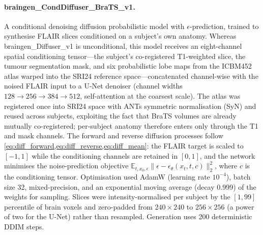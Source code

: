 \paragraph{braingen\_CondDiffuser\_BraTS\_v1.} A conditional denoising diffusion probabilistic
model\cite{ho2020denoising} with $\epsilon$-prediction, trained to synthesise FLAIR slices
conditioned on a subject's own anatomy. Whereas braingen\_Diffuser\_v1 is unconditional, this
model receives an eight-channel spatial conditioning tensor---the subject's co-registered
T1-weighted slice, the tumour segmentation mask, and six probabilistic lobe maps from the
ICBM452 atlas\cite{mazziotta2001probabilistic} warped into the SRI24\cite{rohlfing2010sri24}
reference space---concatenated channel-wise with the noised FLAIR input to a U-Net denoiser
(channel widths $128\!\to\!256\!\to\!384\!\to\!512$, self-attention at the coarsest scale). The
atlas was registered once into SRI24 space with ANTs symmetric normalisation
(SyN)\cite{avants2008syn} and reused across subjects, exploiting the fact that BraTS volumes
are already mutually co-registered; per-subject anatomy therefore enters only through the T1
and mask channels. The forward and reverse diffusion processes follow
\cref{eq:diff_forward,eq:diff_reverse,eq:diff_mean}: the FLAIR target is scaled to $[-1,1]$
while the conditioning channels are retained in $[0,1]$, and the network minimises the
noise-prediction objective
$\mathbb{E}_{t,x_{0},\epsilon}\lVert \epsilon - \epsilon_{\theta}(x_{t},t,c)\rVert_{2}^{2}$,
where $c$ is the conditioning tensor. Optimisation used AdamW (learning rate $10^{-4}$), batch
size 32, mixed-precision, and an exponential moving average (decay 0.999) of the weights for
sampling. Slices were intensity-normalised per subject by the $[1,99]$ percentile of brain
voxels and zero-padded from $240\!\times\!240$ to $256\!\times\!256$ (a power of two for the
U-Net) rather than resampled. Generation uses 200 deterministic DDIM\cite{song2021ddim} steps.


